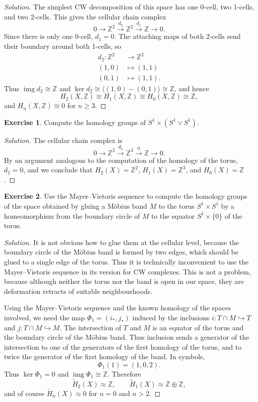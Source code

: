 \documentclass{book}
\theoremstyle{definition}
\newtheorem*{ejer}{Exercise}
\newcommand{\Z}{\mathbb{Z}}
\DeclareMathOperator{\img}{img}
\begin{document}
\begin{proof}[Solution]
The simplest CW decomposition of this space has one 0-cell,
two 1-cells, and two 2-cells. This gives the cellular chain
complex
$$
0\to\Z^2\xrightarrow{d_2}\Z^2\xrightarrow{d_1}\Z\to0.
$$
Since there is only one 0-cell, $d_1=0$. The attaching maps
of both 2-cells send their boundary around both 1-cells, so
$$
\begin{aligned}
d_2:\Z^2&\to\Z^2\\
(1,0)&\mapsto(1,1)\\
(0,1)&\mapsto(1,1).
\end{aligned}
$$
Thus $\img d_2\cong\Z$ and
$\ker d_2\cong\langle(1,0)-(0,1)\rangle\cong\Z$, and hence
$$
H_2(X,\Z)\cong H_1(X,\Z)\cong H_0(X,\Z)\cong\Z,
$$
and $H_n(X,\Z)\cong0$ for $n\geq3$.
\end{proof}

\begin{ejer}
Compute the homology groups of $S^1\times(S^1\vee S^1)$.
\end{ejer}

\begin{proof}[Solution]
The cellular chain complex is
$$
0\to\Z^2\xrightarrow{d_2}\Z^3\xrightarrow{0}\Z\to0.
$$
By an argument analogous to the computation of the homology
of the torus, $d_2=0$, and we conclude that
$H_2(X)=\Z^2$, $H_1(X)=\Z^3$, and $H_0(X)=\Z$.
\end{proof}

\begin{ejer}
Use the Mayer--Vietoris sequence to compute the homology
groups of the space obtained by gluing a M\"obius band $M$ to
the torus $S^1\times S^1$ by a homeomorphism from the
boundary circle of $M$ to the equator $S^1\times\{0\}$ of
the torus.
\end{ejer}

\begin{proof}[Solution]
It is not obvious how to glue them at the cellular level,
because the boundary circle of the M\"obius band is formed by
two edges, which should be glued to a single edge of the
torus. Thus it is technically inconvenient to use the
Mayer--Vietoris sequence in its version for CW complexes.
This is not a problem, because although neither the torus nor
the band is open in our space, they are deformation retracts
of suitable neighbourhoods.

Using the Mayer--Vietoris sequence and the known homology of
the spaces involved, we need the map
$\Phi_1=(i_*,j_*)$ induced by the inclusions
$i:T\cap M\hookrightarrow T$ and $j:T\cap M\hookrightarrow M$.
The intersection of $T$ and $M$ is an equator of the torus and
the boundary circle of the M\"obius band. Thus inclusion sends
a generator of the intersection to one of the generators of
the first homology of the torus, and to twice the generator of
the first homology of the band. In symbols,
$$
\Phi_1(1)=(1,0,2).
$$
Thus $\ker\Phi_1=0$ and $\img\Phi_1\cong\Z$. Therefore
$$
\tilde H_2(X)\approx\Z,
\qquad
\tilde H_1(X)\approx\Z\oplus\Z,
$$
and of course $\tilde H_n(X)\approx0$ for $n=0$ and $n>2$.
\end{proof}
\end{document}
